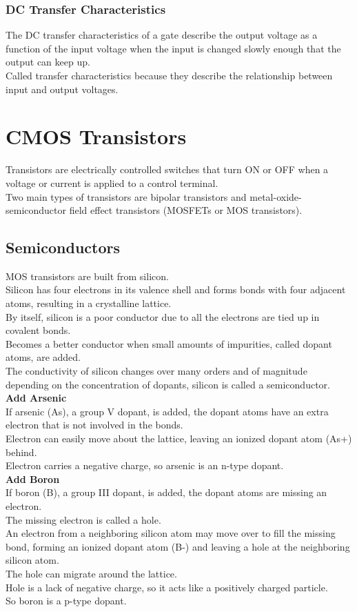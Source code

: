 \documentclass[12pt]{article}
\makeatletter
\theoremstyle{definition}
\def\blfootnote{\gdef\@thefnmark{}\@footnotetext}
\makeatother
\begin{document}
  \blfootnote{Note: power flows from drain to source.}

  \subsubsection{DC Transfer Characteristics}
  The DC transfer characteristics of a gate describe the output voltage as a function of the input voltage when the input is changed slowly enough that the output can keep up. \\
  Called transfer characteristics because they describe the relationship between input and output voltages.

  \section{CMOS Transistors}
  Transistors are electrically controlled switches that turn ON or OFF when a voltage or current is applied to a control terminal. \\
  Two main types of transistors are bipolar transistors and metal-oxide-semiconductor field effect transistors (MOSFETs or MOS transistors).

  \subsection{Semiconductors}
  MOS transistors are built from silicon. \\
  Silicon has four electrons in its valence shell and forms bonds with four adjacent atoms, resulting in a crystalline lattice. \\
  By itself, silicon is a poor conductor due to all the electrons are tied up in covalent bonds. \\
  Becomes a better conductor when small amounts of impurities, called dopant atoms, are added. \\
  The conductivity of silicon changes over many orders and of magnitude depending on the concentration of dopants, silicon is called a semiconductor. \\
  \textbf{Add Arsenic} \\
  If arsenic (As), a group V dopant, is added, the dopant atoms have an extra electron that is not involved in the bonds. \\
  Electron can easily move about the lattice, leaving an ionized dopant atom (As+) behind. \\
  Electron carries a negative charge, so arsenic is an n-type dopant. \\
  \textbf{Add Boron} \\
  If boron (B), a group III dopant, is added, the dopant atoms are missing an electron. \\
  The missing electron is called a hole. \\
  An electron from a neighboring silicon atom may move over to fill the missing bond, forming an ionized dopant atom (B-) and leaving a hole at the neighboring silicon atom. \\
  The hole can migrate around the lattice. \\
  Hole is a lack of negative charge, so it acts like a positively charged particle. \\
  So boron is a p-type dopant.
\end{document}
